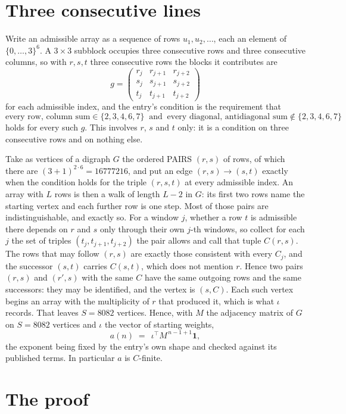 \documentclass[11pt,a4paper]{article}
\theoremstyle{plain}
\theoremstyle{definition}
\begin{document}
\section{Three consecutive lines}

Write an admissible array as a sequence of rows $u_1,u_2,\dots$, each an element of
$\{0,\dots,3\}^{6}$. A $3\times3$ subblock occupies three consecutive rows and
three consecutive columns, so with $r,s,t$ three consecutive rows the blocks it
contributes are
\[
g=\begin{pmatrix}r_j&r_{j+1}&r_{j+2}\\ s_j&s_{j+1}&s_{j+2}\\ t_j&t_{j+1}&t_{j+2}\end{pmatrix}
\]
for each admissible index, and the entry's condition is the requirement that
\[
\text{every row, column sum} \in \{2,3,4,6,7\}\ \text{ and }\ \text{every diagonal, antidiagonal sum} \notin \{2,3,4,6,7\}
\]
holds for every such $g$. This involves $r$, $s$ and $t$ only: it is a condition on
three consecutive rows and on nothing else.

Take as vertices of a digraph $G$ the ordered PAIRS $(r,s)$ of rows, of which there are
$(3+1)^{2\cdot6}=16777216$, and put an edge $(r,s)\to(s,t)$ exactly when the condition
holds for the triple $(r,s,t)$ at every admissible index. An array with $L$ rows is then a
walk of length $L-2$ in $G$: its first two rows name the starting vertex and each further
row is one step. Most of those pairs are indistinguishable, and exactly so. For a window $j$, whether a row $t$ is admissible there depends on $r$ and $s$ only through their own $j$-th windows, so collect for each $j$ the set of triples $(t_j,t_{j+1},t_{j+2})$ the pair allows and call that tuple $C(r,s)$. The rows that may follow $(r,s)$ are exactly those consistent with every $C_j$, and the successor $(s,t)$ carries $C(s,t)$, which does not mention $r$. Hence two pairs $(r,s)$ and $(r',s)$ with the same $C$ have the same outgoing rows and the same successors: they may be identified, and the vertex is $(s,C)$. Each such vertex begins an array with the multiplicity of $r$ that produced it, which is what $\iota$ records. That leaves $S=8082$ vertices. Hence, with $M$ the adjacency matrix of $G$ on $S=8082$ vertices and
$\iota$ the vector of starting weights,
\[
a(n)\;=\;\,\iota^{\!\top}M^{\,n-1+1}\mathbf{1},
\]
the exponent being fixed by the entry's own shape and checked against its published terms.
In particular $a$ is $C$-finite.

\section{The proof}
\end{document}
